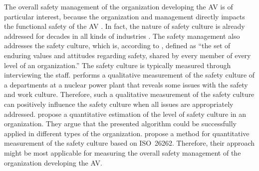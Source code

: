 %

The overall safety management of the organization developing the AV is of particular interest, because the organization and management directly impacts the functional safety of the AV \cite{yaping2019safetydriven}. In fact, the nature of safety culture is already addressed for decades in all kinds of industries \cite{choudhry2007nature}. The safety management also addresses the safety culture, which is, according to \textcite[p.~5]{piers2009safety}, defined as ``the set of enduring values and attitudes regarding safety, shared by every member of every level of an organization.'' The safety culture is typically measured through interviewing the staff. \textcite{carroll1998safety} performs a qualitative measurement of the safety culture of a departments at a nuclear power plant that reveals some issues with the safety and work culture. Therefore, such a qualitative measurement of the safety culture can positively influence the safety culture when all issues are appropriately addressed. \textcite{warszawska2016method} propose a quantitative estimation of the level of safety culture in an organization. They argue that the presented algorithm could be successfully applied in different types of the organization. \textcite{khabbazsaberi2018method} propose a method for quantitative measurement of the safety culture based on ISO~26262. Therefore, their approach might be most applicable for measuring the overall safety management of the organization developing the AV.

